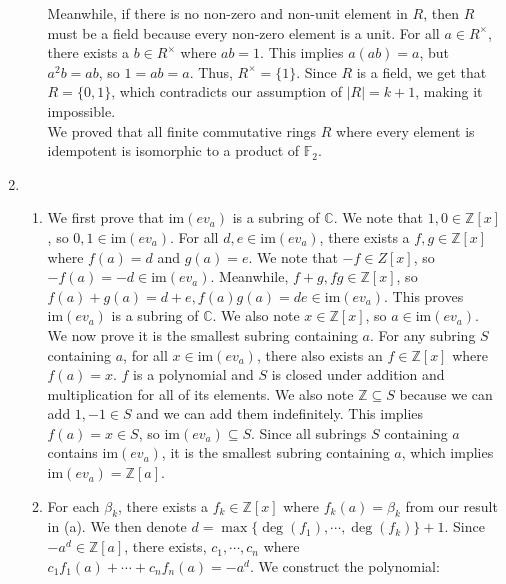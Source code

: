 \documentclass{article}
\begin{document}
\begin{enumerate}
\begin{enumerate}
    Meanwhile, if there is no non-zero and non-unit element in $R$, then $R$ must be a field because every non-zero element is a unit. For all $a \in R^{\times}$, there exists a $b \in R^{\times}$ where $ab = 1$. This implies $a(ab) = a$, but $a^2b = ab$, so $1 = ab = a$. Thus, $R^{\times} = \{1\}$. Since $R$ is a field, we get that $R = \{0, 1\}$, which contradicts our assumption of $|R| = k + 1$, making it impossible. \\

    We proved that all finite commutative rings $R$ where every element is idempotent is isomorphic to a product of $\mathbb{F}_2$.

    
\end{enumerate}

\newpage

\item
\begin{enumerate}
    \item 
    We first prove that $\text{im}(ev_a)$ is a subring of $\mathbb{C}$. We note that $1, 0 \in \mathbb{Z}[x]$, so $0, 1 \in \text{im}(ev_a)$. For all $d,e \in \text{im}(ev_a)$, there exists a $f, g \in \mathbb{Z}[x]$ where $f(a) = d$ and $g(a) = e$. We note that $-f \in Z[x]$, so $-f(a) = -d \in \text{im}(ev_a)$. Meanwhile, $f + g, fg \in \mathbb{Z}[x]$, so $f(a) + g(a) = d + e, f(a)g(a) = de \in \text{im}(ev_a)$. This proves $\text{im}(ev_a)$ is a subring of $\mathbb{C}$. We also note $x \in \mathbb{Z}[x]$, so $a \in \text{im}(ev_a)$.\\

    We now prove it is the smallest subring containing $a$. For any subring $S$ containing $a$, for all $x \in \text{im}(ev_a)$, there also exists an $f \in \mathbb{Z}[x]$ where $f(a) = x$. $f$ is a polynomial and $S$ is closed under addition and multiplication for all of its elements. We also note $\mathbb{Z} \subseteq S$ because we can add $1, -1 \in S$ and we can add them indefinitely. This implies $f(a) = x \in S$, so $\text{im}(ev_a) \subseteq S$. Since all subrings $S$ containing $a$ contains $\text{im}(ev_a)$, it is the smallest subring containing $a$, which implies $\text{im}(ev_a) = \mathbb{Z}[a]$. \\

    \item 
    For each $\beta_k$, there exists a $f_k \in \mathbb{Z}[x]$ where $f_k(a) = \beta_k$ from our result in (a). We then denote $d = \max\{ \deg(f_1), \cdots , \deg(f_k) \} + 1$. Since $-a^d \in \mathbb{Z}[a]$, there exists, $c_1, \cdots, c_n$ where $c_1f_1(a) + \cdots + c_n f_n(a) = -a^d $. We construct the polynomial: 


\end{enumerate}
\end{enumerate}
\end{document}
